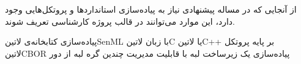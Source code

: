
از آنجایی که در مساله پیشنهادی نیاز به پیاده‌سازی استانداردها و پروتکل‌هایی وجود دارد، این موارد می‌توانند در قالب پروژه کارشناسی تعریف شوند.

 پیاده‌سازی کتابخانه‌ی ‌لاتین{SenML} با زبان ‌لاتین{C} یا ‌لاتین{C++} بر پایه پروتکل ‌لاتین{CBOR}
 پیاده‌سازی یک زیرساخت لبه با قابلیت مدیریت چندین گره لبه از دور
